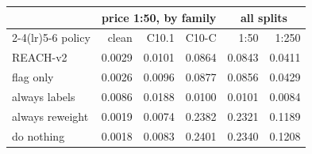 \begin{tabular}{lrrrrr}
\toprule
 & \multicolumn{3}{c}{price 1:50, by family} & \multicolumn{2}{c}{all splits} \\
\cmidrule(lr){2-4}\cmidrule(lr){5-6}
policy & clean & C10.1 & C10-C & 1:50 & 1:250 \\
\midrule
REACH-v2 & 0.0029 & 0.0101 & 0.0864 & 0.0843 & 0.0411 \\
flag only & 0.0026 & 0.0096 & 0.0877 & 0.0856 & 0.0429 \\
always labels & 0.0086 & 0.0188 & 0.0100 & 0.0101 & 0.0084 \\
always reweight & 0.0019 & 0.0074 & 0.2382 & 0.2321 & 0.1189 \\
do nothing & 0.0018 & 0.0083 & 0.2401 & 0.2340 & 0.1208 \\
\bottomrule
\end{tabular}
